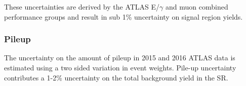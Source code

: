 \indent These uncertainties are derived by the ATLAS E/$\gamma$ and muon combined performance groups and result in sub 1\% uncertainty on signal region yields. \\

\subsubsection*{Pileup}

\indent The uncertainty on the amount of pileup in 2015 and 2016 ATLAS data is estimated using a two sided variation in event weights.  Pile-up uncertainty contributes a 1-2\% uncertainty on the total background yield in the SR.








  

  
